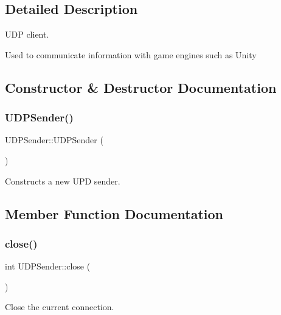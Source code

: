 \subsection{Detailed Description}
U\+DP client. 

Used to communicate information with game engines such as Unity 

\subsection{Constructor \& Destructor Documentation}
\hypertarget{class_u_d_p_sender_a77c0f2eb66dbc9a912b4fede20de3f03}{}\label{class_u_d_p_sender_a77c0f2eb66dbc9a912b4fede20de3f03} 
\subsubsection{\texorpdfstring{U\+D\+P\+Sender()}{UDPSender()}}
{\footnotesize\ttfamily U\+D\+P\+Sender\+::\+U\+D\+P\+Sender (\begin{DoxyParamCaption}{ }\end{DoxyParamCaption})}



Constructs a new U\+PD sender. 



\subsection{Member Function Documentation}
\hypertarget{class_u_d_p_sender_a9633801c0b923a53d42061f2233d06ef}{}\label{class_u_d_p_sender_a9633801c0b923a53d42061f2233d06ef} 
\subsubsection{\texorpdfstring{close()}{close()}}
{\footnotesize\ttfamily int U\+D\+P\+Sender\+::close (\begin{DoxyParamCaption}{ }\end{DoxyParamCaption})}



Close the current connection. 

\hypertarget{class_u_d_p_sender_a33d402a42a2d512bd12189e1f698cca4}{}\label{class_u_d_p_sender_a33d402a42a2d512bd12189e1f698cca4} 

